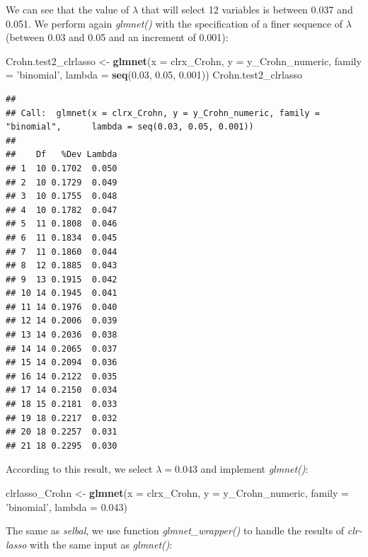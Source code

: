 \documentclass[openany]{book}
\newenvironment{Shaded}{\begin{snugshade}}{\end{snugshade}}
\newcommand{\KeywordTok}[1]{\textcolor[rgb]{0.13,0.29,0.53}{\textbf{#1}}}
\newcommand{\DataTypeTok}[1]{\textcolor[rgb]{0.13,0.29,0.53}{#1}}
\newcommand{\FloatTok}[1]{\textcolor[rgb]{0.00,0.00,0.81}{#1}}
\newcommand{\StringTok}[1]{\textcolor[rgb]{0.31,0.60,0.02}{#1}}
\newcommand{\NormalTok}[1]{#1}
\begin{document}
We can see that the value of \(\lambda\) that will select 12 variables
is between 0.037 and 0.051. We perform again \emph{glmnet()} with the
specification of a finer sequence of \(\lambda\) (between 0.03 and 0.05
and an increment of 0.001):

\begin{Shaded}
\begin{Highlighting}[]
\NormalTok{Crohn.test2_clrlasso <-}\StringTok{ }\KeywordTok{glmnet}\NormalTok{(}\DataTypeTok{x =}\NormalTok{ clrx_Crohn, }\DataTypeTok{y =}\NormalTok{ y_Crohn_numeric, }
                               \DataTypeTok{family =} \StringTok{'binomial'}\NormalTok{, }\DataTypeTok{lambda =} \KeywordTok{seq}\NormalTok{(}\FloatTok{0.03}\NormalTok{, }\FloatTok{0.05}\NormalTok{, }\FloatTok{0.001}\NormalTok{))}
\NormalTok{Crohn.test2_clrlasso}
\end{Highlighting}
\end{Shaded}

\begin{verbatim}
## 
## Call:  glmnet(x = clrx_Crohn, y = y_Crohn_numeric, family = "binomial",      lambda = seq(0.03, 0.05, 0.001)) 
## 
##    Df   %Dev Lambda
## 1  10 0.1702  0.050
## 2  10 0.1729  0.049
## 3  10 0.1755  0.048
## 4  10 0.1782  0.047
## 5  11 0.1808  0.046
## 6  11 0.1834  0.045
## 7  11 0.1860  0.044
## 8  12 0.1885  0.043
## 9  13 0.1915  0.042
## 10 14 0.1945  0.041
## 11 14 0.1976  0.040
## 12 14 0.2006  0.039
## 13 14 0.2036  0.038
## 14 14 0.2065  0.037
## 15 14 0.2094  0.036
## 16 14 0.2122  0.035
## 17 14 0.2150  0.034
## 18 15 0.2181  0.033
## 19 18 0.2217  0.032
## 20 18 0.2257  0.031
## 21 18 0.2295  0.030
\end{verbatim}

According to this result, we select \(\lambda = 0.043\) and implement
\emph{glmnet()}:

\begin{Shaded}
\begin{Highlighting}[]
\NormalTok{clrlasso_Crohn <-}\StringTok{ }\KeywordTok{glmnet}\NormalTok{(}\DataTypeTok{x =}\NormalTok{ clrx_Crohn, }\DataTypeTok{y =}\NormalTok{ y_Crohn_numeric, }
                         \DataTypeTok{family =} \StringTok{'binomial'}\NormalTok{, }\DataTypeTok{lambda =} \FloatTok{0.043}\NormalTok{)}
\end{Highlighting}
\end{Shaded}

The same as \emph{selbal}, we use function \emph{glmnet\_wrapper()} to
handle the results of \emph{clr-lasso} with the same input as
\emph{glmnet()}:
\end{document}
